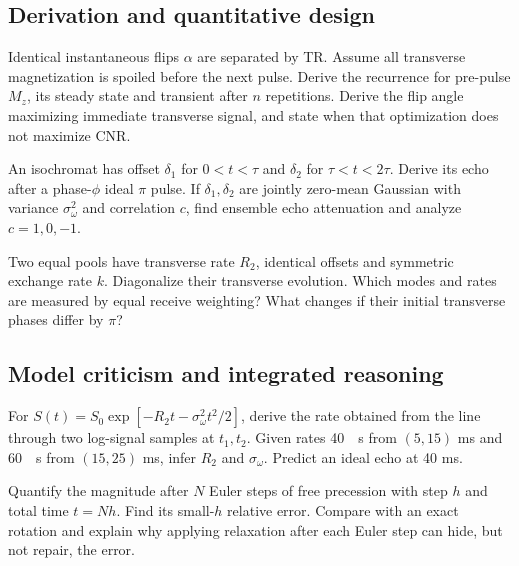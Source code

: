 \subsection{Derivation and quantitative design}
\begin{challengeproblem}
\label{prob:03:steady}
Identical instantaneous flips $\alpha$ are separated by TR.
Assume all transverse magnetization is spoiled before the next pulse.
Derive the recurrence for pre-pulse $M_z$, its steady state and transient
after $n$ repetitions. Derive the flip angle maximizing immediate
transverse signal, and state when that optimization does not maximize CNR.
\end{challengeproblem}
\begin{challengeproblem}
\label{prob:03:echo}
An isochromat has offset $\delta_1$ for $0<t<\tau$ and $\delta_2$
for $\tau<t<2\tau$. Derive its echo after a phase-$\phi$ ideal
$\pi$ pulse. If $\delta_1,\delta_2$ are jointly zero-mean Gaussian
with variance $\sigma_\omega^2$ and correlation $c$, find ensemble
echo attenuation and analyze $c=1,0,-1$.
\end{challengeproblem}
\begin{challengeproblem}
\label{prob:03:exchange}
Two equal pools have transverse rate $R_2$, identical offsets and
symmetric exchange rate $k$. Diagonalize their transverse evolution.
Which modes and rates are measured by equal receive weighting?
What changes if their initial transverse phases differ by $\pi$?
\end{challengeproblem}
\subsection{Model criticism and integrated reasoning}
\begin{challengeproblem}
\label{prob:03:fit}
For $S(t)=S_0\exp[-R_2t-\sigma_\omega^2t^2/2]$,
derive the rate obtained from the line through two log-signal samples
at $t_1,t_2$. Given rates \SI{40}{\per\second} from $(5,15)$ ms
and \SI{60}{\per\second} from $(15,25)$ ms, infer $R_2$ and
$\sigma_\omega$. Predict an ideal echo at 40 ms.
\end{challengeproblem}
\begin{challengeproblem}
\label{prob:03:euler}
Quantify the magnitude after $N$ Euler steps of free precession with
step $h$ and total time $t=Nh$. Find its small-$h$ relative error.
Compare with an exact rotation and explain why applying relaxation
after each Euler step can hide, but not repair, the error.
\end{challengeproblem}
